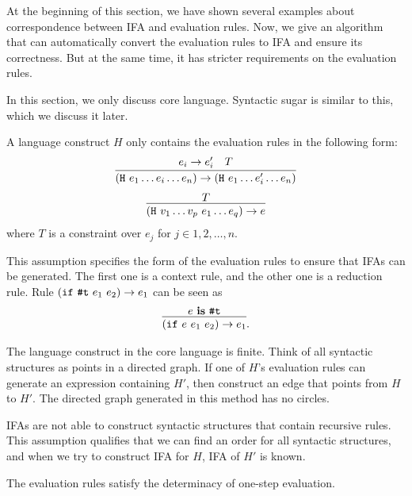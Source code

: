 At the beginning of this section, we have shown several examples about correspondence between IFA and evaluation rules. Now, we give an algorithm that can automatically convert the evaluation rules to IFA and ensure its correctness. But at the same time, it has stricter requirements on the evaluation rules.

In this section, we only discuss core language. Syntactic sugar is similar to this, which we discuss it later.


\begin{Asm}
    \label{Asm:rules}
    A language construct $H$ only contains the evaluation rules in the following form:
    \[
        \infer
        {(\m{H}~e_1 \ldots e_i \ldots e_n) \to (\m{H}~e_1 \ldots e_i' \ldots e_n)}{e_i \to e_i'\quad T}
    \]
    \[
        \infer{(\m{H}~v_1 \ldots v_p~e_1 \ldots e_q) \to e}{T}
    \]
    where $T$ is a constraint over $e_j$ for $j \in 1,2,\ldots,n$.
\end{Asm}

This assumption specifies the form of the evaluation rules to ensure that IFAs can be generated. The first one is a context rule, and the other one is a reduction rule. Rule $(\mbox{\tt if}~\mbox{\tt \#t}~e_1~e_2) \to e_1$ can be seen as \[\infer{(\m{if}~e~e_1~e_2) \to e_1}{e~\key{is}~\m{\#t}}.\]

\begin{Asm}
    \label{Asm:orderliness}
    The language construct in the core language is finite. Think of all syntactic structures as points in a directed graph. If one of $H$'s evaluation rules can generate an expression containing $H'$, then construct an edge that points from $H$ to $H'$. The directed graph generated in this method has no circles.
\end{Asm}

IFAs are not able to construct syntactic structures that contain recursive rules. This assumption qualifies that we can find an order for all syntactic structures, and when we try to construct IFA for $H$, IFA of $H'$ is known.

\begin{Asm}
    \label{Asm:determinacy}
    The evaluation rules satisfy the determinacy of one-step evaluation.
\end{Asm}

